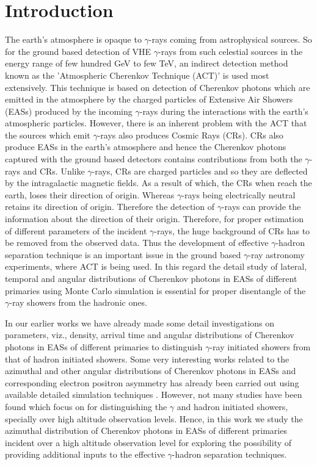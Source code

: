 \documentclass[amsmath,amssymb,showpacs,showkeywords]{revtex4}
\begin{document}
\section{Introduction}
\label{sec1}
The earth's atmosphere is opaque to $\gamma$-rays coming from astrophysical
sources. So for the ground based 
detection of VHE $\gamma$-rays from such celestial sources in the energy range 
of few hundred GeV to few TeV, an indirect detection method known as the 
'Atmospheric Cherenkov Technique (ACT)' is used most extensively. This 
technique is based on detection of Cherenkov photons which are emitted in the
atmosphere by the charged particles of Extensive Air Showers (EASs) produced
by the incoming $\gamma$-rays during the interactions with the earth's 
atmospheric particles. However, there is an inherent problem with the ACT that 
the sources which emit $\gamma$-rays also produces Cosmic Rays (CRs). CRs
also produce EASs in the earth's atmosphere and hence the Cherenkov photons 
captured with the ground based detectors contains contributions from both the 
$\gamma$-rays and CRs. Unlike $\gamma$-rays, CRs are charged particles and 
so they are deflected by the intragalactic magnetic fields. As a result of 
which, the CRs when reach the earth, loses their direction of origin. 
Whereas $\gamma$-rays being electrically neutral retains its direction of 
origin. Therefore the detection of $\gamma$-rays can provide the information 
about the direction of their origin. Therefore, for proper estimation of 
different parameters of the incident $\gamma$-rays, the huge background of CRs 
has to be removed from the observed data. Thus the development of effective 
$\gamma$-hadron separation technique is an important issue in the ground based
$\gamma$-ray astronomy experiments, where ACT is being used. In this regard 
the detail study of lateral, temporal and angular distributions of Cherenkov 
photons in EASs of different primaries using Monte Carlo simulation is 
essential for proper disentangle of the $\gamma$-ray showers from the hadronic 
ones. 

In our earlier works \cite{Hazarika, Das} we have already made some detail 
investigations on parameters, viz., density, arrival time and angular 
distributions of Cherenkov photons in EASs of different primaries to 
distinguish $\gamma$-ray initiated showers from that of hadron initiated
showers. Some very interesting works related
to the azimuthal and other angular distributions of Cherenkov photons in EASs 
and corresponding 
electron positron asymmetry has already been carried out using available 
detailed simulation techniques \cite{Homola, Bardan, Cabot, Hillas, Lafebre, 
Nerling}. However, not many studies have been found which focus on for 
distinguishing the 
$\gamma$ and hadron initiated showers, specially over high altitude observation
levels. Hence, in this work we study the azimuthal distribution
of Cherenkov photons in EASs of different primaries incident over a high 
altitude observation level for exploring the possibility of providing 
additional inputs to the effective $\gamma$-hadron separation techniques. 
\end{document}
